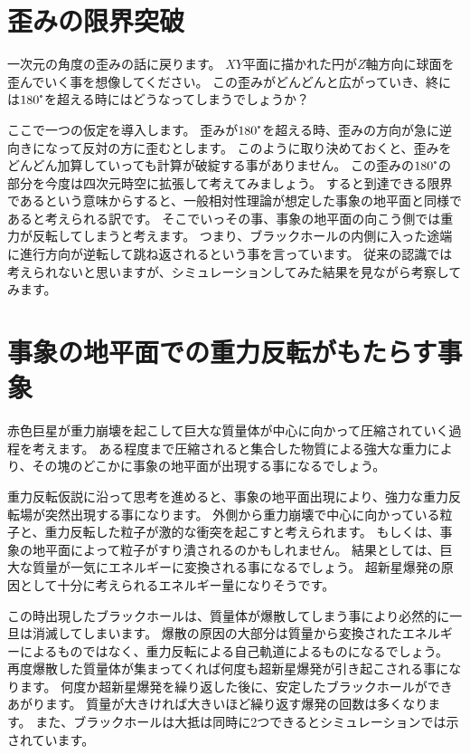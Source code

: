 \documentclass[a4paper,12pt,notitlepage]{jsreport}
\begin{document}
\section{歪みの限界突破}

一次元の角度の歪みの話に戻ります。
$XY$平面に描かれた円が$Z$軸方向に球面を歪んでいく事を想像してください。
この歪みがどんどんと広がっていき、終には$180\tcdegree$を超える時にはどうなってしまうでしょうか？

ここで一つの仮定を導入します。
歪みが$180\tcdegree$を超える時、歪みの方向が急に逆向きになって反対の方に歪むとします。
このように取り決めておくと、歪みをどんどん加算していっても計算が破綻する事がありません。
この歪みの$180\tcdegree$の部分を今度は四次元時空に拡張して考えてみましょう。
すると到達できる限界であるという意味からすると、一般相対性理論が想定した事象の地平面と同様であると考えられる訳です。
そこでいっその事、事象の地平面の向こう側では重力が反転してしまうと考えます。
つまり、ブラックホールの内側に入った途端に進行方向が逆転して跳ね返されるという事を言っています。
従来の認識では考えられないと思いますが、シミュレーションしてみた結果を見ながら考察してみます。

\section{事象の地平面での重力反転がもたらす事象}

赤色巨星が重力崩壊を起こして巨大な質量体が中心に向かって圧縮されていく過程を考えます。
ある程度まで圧縮されると集合した物質による強大な重力により、その塊のどこかに事象の地平面が出現する事になるでしょう。

重力反転仮説に沿って思考を進めると、事象の地平面出現により、強力な重力反転場が突然出現する事になります。
外側から重力崩壊で中心に向かっている粒子と、重力反転した粒子が激的な衝突を起こすと考えられます。
もしくは、事象の地平面によって粒子がすり潰されるのかもしれません。
結果としては、巨大な質量が一気にエネルギーに変換される事になるでしょう。
超新星爆発の原因として十分に考えられるエネルギー量になりそうです。

この時出現したブラックホールは、質量体が爆散してしまう事により必然的に一旦は消滅してしまいます。
爆散の原因の大部分は質量から変換されたエネルギーによるものではなく、重力反転による自己軌道によるものになるでしょう。
再度爆散した質量体が集まってくれば何度も超新星爆発が引き起こされる事になります。
何度か超新星爆発を繰り返した後に、安定したブラックホールができあがります。
質量が大きければ大きいほど繰り返す爆発の回数は多くなります。
また、ブラックホールは大抵は同時に2つできるとシミュレーションでは示されています。
\end{document}
